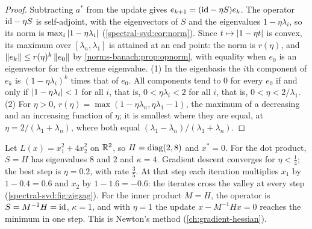 \begin{notechapter}
\begin{proof}
Subtracting $a^*$ from the update gives $e_{k+1} = (\mathrm{id} - \eta S)e_k$. The
operator $\mathrm{id} - \eta S$ is self-adjoint, with the eigenvectors of $S$ and
the eigenvalues $1 - \eta\lambda_i$, so its norm is
$\max_i\left|1 - \eta\lambda_i\right|$ (\cref{spectral-svd:cor:norm}). Since
$t\mapsto\left|1 - \eta t\right|$ is convex, its maximum over
$[\lambda_n, \lambda_1]$ is attained at an end point: the norm is
$r(\eta)$, and $\left\|e_k\right\|\leq r(\eta)^k\left\|e_0\right\|$ by
\cref{norms-banach:prop:opnorm}, with equality when $e_0$ is an
eigenvector for the extreme eigenvalue. (1) In the eigenbasis the $i$th
component of $e_k$ is $(1 - \eta\lambda_i)^k$ times that of $e_0$. All
components tend to $0$ for every $e_0$ if and only if
$\left|1 - \eta\lambda_i\right| < 1$ for all $i$, that is,
$0 < \eta\lambda_i < 2$ for all $i$, that is, $0 < \eta < 2/\lambda_1$.
(2) For $\eta > 0$, $r(\eta) = \max(1 - \eta\lambda_n, \eta\lambda_1 - 1)$,
the maximum of a decreasing and an increasing function of $\eta$; it is
smallest where they are equal, at $\eta = 2/(\lambda_1 + \lambda_n)$,
where both equal $(\lambda_1 - \lambda_n)/(\lambda_1 + \lambda_n)$.
\end{proof}

\begin{example}\label{spectral-svd:ex:zigzag}
Let $L(x) = x_1^2 + 4x_2^2$ on $\mathbb{R}^2$, so $H = \operatorname{diag}(2, 8)$ and
$x^* = 0$. For the dot product, $S = H$ has eigenvalues $8$ and $2$ and
$\kappa = 4$. Gradient descent converges for $\eta < \frac14$; the best
step is $\eta = 0.2$, with rate $\frac35$. At that step each iteration
multiplies $x_1$ by $1 - 0.4 = 0.6$ and $x_2$ by $1 - 1.6 = -0.6$: the
iterates cross the valley at every step
(\cref{spectral-svd:fig:zigzag}). For the inner product $M = H$, the
operator is $S = M^{-1}H = \mathrm{id}$, $\kappa = 1$, and with $\eta = 1$ the
update $x - M^{-1}Hx = 0$ reaches the minimum in one step. This is
Newton's method (\cref{ch:gradient-hessian}).
\end{example}


\end{notechapter}

